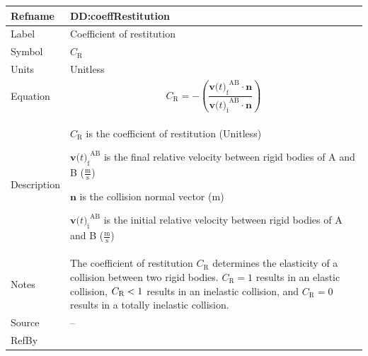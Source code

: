 \documentclass[12pt]{article}
\newcommand{\lt}{\ensuremath <}
\begin{document}
\medskip
\noindent
\begin{minipage}{\textwidth}
\begin{tabular}{>{\raggedright}p{}>{\raggedright\arraybackslash}p{}}
\toprule \textbf{Refname} & \textbf{DD:coeffRestitution}
\label{DD:coeffRestitution}
\\ \midrule
Label & Coefficient of restitution
        
\\ \midrule
Symbol & ${C_{\text{R}}}$
         
\\ \midrule
Units & Unitless
        
\\ \midrule
Equation & \begin{displaymath}
           {C_{\text{R}}}=-\left(\frac{{{\symbf{v}\text{(}t\text{)}_{\text{f}}}^{\text{A}\text{B}}}\cdot{}\symbf{n}}{{{\symbf{v}\text{(}t\text{)}_{\text{i}}}^{\text{A}\text{B}}}\cdot{}\symbf{n}}\right)
           \end{displaymath}
\\ \midrule
Description & \begin{symbDescription}
              \item{${C_{\text{R}}}$ is the coefficient of restitution (Unitless)}
              \item{${{\symbf{v}\text{(}t\text{)}_{\text{f}}}^{\text{A}\text{B}}}$ is the final relative velocity between rigid bodies of A and B ($\frac{\text{m}}{\text{s}}$)}
              \item{$\symbf{n}$ is the collision normal vector (${\text{m}}$)}
              \item{${{\symbf{v}\text{(}t\text{)}_{\text{i}}}^{\text{A}\text{B}}}$ is the initial relative velocity between rigid bodies of A and B ($\frac{\text{m}}{\text{s}}$)}
              \end{symbDescription}
\\ \midrule
Notes & The coefficient of restitution ${C_{\text{R}}}$ determines the elasticity of a collision between two rigid bodies. ${C_{\text{R}}}=1$ results in an elastic collision, ${C_{\text{R}}}\lt{}1$ results in an inelastic collision, and ${C_{\text{R}}}=0$ results in a totally inelastic collision.
        
\\ \midrule
Source & --
         
\\ \midrule
RefBy & 
\\ \bottomrule
\end{tabular}
\end{minipage}
\end{document}
